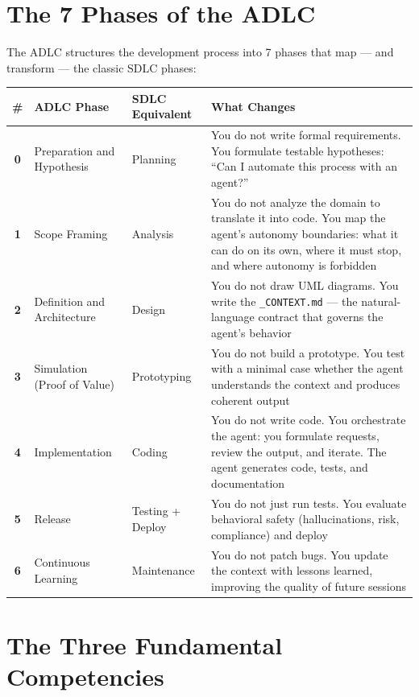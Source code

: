 \section*{The 7 Phases of the ADLC}

The ADLC structures the development process into 7 phases that map --- and transform --- the classic SDLC phases:

\begin{small}
\begin{longtable}{c p{3cm} p{2.5cm} p{5.5cm}}
\toprule
\textbf{\#} & \textbf{ADLC Phase} & \textbf{SDLC Equivalent} & \textbf{What Changes} \\
\midrule
\endhead
\textbf{0} & Preparation and Hypothesis & Planning & You do not write formal requirements. You formulate testable hypotheses: ``Can I automate this process with an agent?'' \\
\midrule
\textbf{1} & Scope Framing & Analysis & You do not analyze the domain to translate it into code. You map the agent's autonomy boundaries: what it can do on its own, where it must stop, and where autonomy is forbidden \\
\midrule
\textbf{2} & Definition and Architecture & Design & You do not draw UML diagrams. You write the \texttt{\_CONTEXT.md} --- the natural-language contract that governs the agent's behavior \\
\midrule
\textbf{3} & Simulation (Proof of Value) & Prototyping & You do not build a prototype. You test with a minimal case whether the agent understands the context and produces coherent output \\
\midrule
\textbf{4} & Implementation & Coding & You do not write code. You orchestrate the agent: you formulate requests, review the output, and iterate. The agent generates code, tests, and documentation \\
\midrule
\textbf{5} & Release & Testing + Deploy & You do not just run tests. You evaluate behavioral safety (hallucinations, risk, compliance) and deploy \\
\midrule
\textbf{6} & Continuous Learning & Maintenance & You do not patch bugs. You update the context with lessons learned, improving the quality of future sessions \\
\bottomrule
\end{longtable}
\end{small}

\section*{The Three Fundamental Competencies}

